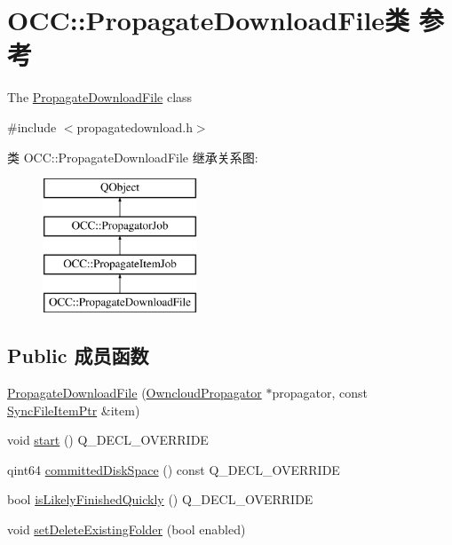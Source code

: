 \hypertarget{class_o_c_c_1_1_propagate_download_file}{}\section{O\+CC\+:\+:Propagate\+Download\+File类 参考}
\label{class_o_c_c_1_1_propagate_download_file}


The \hyperlink{class_o_c_c_1_1_propagate_download_file}{Propagate\+Download\+File} class  




{\ttfamily \#include $<$propagatedownload.\+h$>$}

类 O\+CC\+:\+:Propagate\+Download\+File 继承关系图\+:\begin{figure}[H]
\begin{center}
\leavevmode
\includegraphics[height=4.000000cm]{class_o_c_c_1_1_propagate_download_file}
\end{center}
\end{figure}
\subsection*{Public 成员函数}
\begin{DoxyCompactItemize}
\item 
\hyperlink{class_o_c_c_1_1_propagate_download_file_ab9ce2facd6ac1358f0c126352f40e009}{Propagate\+Download\+File} (\hyperlink{class_o_c_c_1_1_owncloud_propagator}{Owncloud\+Propagator} $\ast$propagator, const \hyperlink{namespace_o_c_c_acb6b0db82893659fbd0c98d3c5b8e2b8}{Sync\+File\+Item\+Ptr} \&item)
\item 
void \hyperlink{class_o_c_c_1_1_propagate_download_file_ade2a2624bf1c87f82d032d1d60790352}{start} () Q\+\_\+\+D\+E\+C\+L\+\_\+\+O\+V\+E\+R\+R\+I\+DE
\item 
qint64 \hyperlink{class_o_c_c_1_1_propagate_download_file_afd083d008504e3b14c75d1de763e7d1e}{committed\+Disk\+Space} () const Q\+\_\+\+D\+E\+C\+L\+\_\+\+O\+V\+E\+R\+R\+I\+DE
\item 
bool \hyperlink{class_o_c_c_1_1_propagate_download_file_a70add8f78720fbedddca87fc139ac737}{is\+Likely\+Finished\+Quickly} () Q\+\_\+\+D\+E\+C\+L\+\_\+\+O\+V\+E\+R\+R\+I\+DE
\item 
void \hyperlink{class_o_c_c_1_1_propagate_download_file_aa32f9719b66c1f34e4e4aad09f27e563}{set\+Delete\+Existing\+Folder} (bool enabled)
\end{DoxyCompactItemize}
